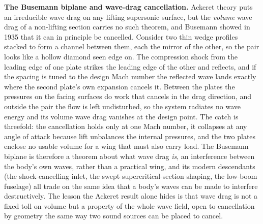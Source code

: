 \begin{mastery}
\textbf{The Busemann biplane and wave-drag cancellation.} Ackeret theory
puts an irreducible wave drag on any lifting supersonic surface, but the
\emph{volume} wave drag of a non-lifting section carries no such
theorem, and Busemann showed in 1935 that it can in principle be
cancelled. Consider two thin wedge profiles stacked to form a channel
between them, each the mirror of the other, so the pair looks like a
hollow diamond seen edge on. The compression shock from the leading edge
of one plate strikes the leading edge of the other and reflects, and if
the spacing is tuned to the design Mach number the reflected wave lands
exactly where the second plate's own expansion cancels it. Between the
plates the pressures on the facing surfaces do work that cancels in the
drag direction, and outside the pair the flow is left undisturbed, so
the system radiates no wave energy and its volume wave drag vanishes at
the design point. The catch is threefold: the cancellation holds only at
one Mach number, it collapses at any angle of attack because lift
unbalances the internal pressures, and the two plates enclose no usable
volume for a wing that must also carry load. The Busemann biplane is
therefore a theorem about what wave drag \emph{is}, an interference
between the body's own waves, rather than a practical wing, and its
modern descendants (the shock-cancelling inlet, the swept
supercritical-section shaping, the low-boom fuselage) all trade on the
same idea that a body's waves can be made to interfere destructively.
The lesson the Ackeret result alone hides is that wave drag is not a
fixed toll on volume but a property of the whole wave field, open to
cancellation by geometry the same way two sound sources can be placed to
cancel.
\end{mastery}

